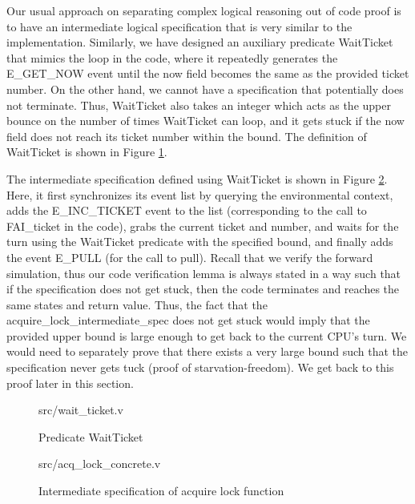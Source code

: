 Our usual approach on separating complex logical reasoning out of code proof is to have an intermediate
logical specification that is very similar to the implementation. Similarly, we have designed an auxiliary predicate
\textsf{WaitTicket} that mimics the loop in the code, where it repeatedly generates the \textsf{E\_GET\_NOW}
event until the \textsf{now} field becomes the same as the provided ticket number. 
On the other hand, we cannot have a specification that potentially does not terminate.
Thus, \textsf{WaitTicket} also takes an integer  which acts as the upper bounce on the
number of times \textsf{WaitTicket} can loop, and it gets stuck if the \textsf{now} field
does not reach its ticket number within the bound.
The definition of \textsf{WaitTicket} is shown in Figure \ref{fig:wait_ticket_v}.

The intermediate specification defined using \textsf{WaitTicket} is shown in Figure \ref{fig:acq_lock_concrete_v}.
Here, it first synchronizes its event list by querying the environmental context, adds the
\textsf{E\_INC\_TICKET} event to the list (corresponding to the call to \textsf{FAI\_ticket} in the code),
grabs the current ticket and number, and waits for the turn using the \textsf{WaitTicket} predicate
with the specified bound, and finally adds the event \textsf{E\_PULL} (for the call to \textsf{pull}).
Recall that we verify the forward simulation, thus our code verification lemma is always stated
in a way such that if the specification does not get stuck, then the code terminates and reaches
the same states and return value. Thus, the fact that the \textsf{acquire\_lock\_intermediate\_spec}
does not get stuck would imply that the provided upper bound is large enough to get back to
the current CPU's turn. We would need to separately prove that there exists a very large bound
such that the specification never gets tuck (proof of starvation-freedom). We get back to this proof later
in this section.

\begin{figure}
	 {src/wait_ticket.v}
	\caption{Predicate WaitTicket}
	\label{fig:wait_ticket_v}
\end{figure}

\begin{figure}
	 {src/acq_lock_concrete.v}
	\caption{Intermediate specification of acquire lock function}
	\label{fig:acq_lock_concrete_v}
\end{figure}

